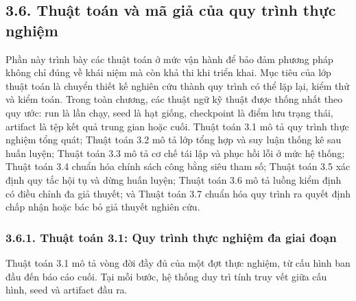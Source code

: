 \documentclass[a4paper,12pt]{article}
\begin{document}
\subsection{3.6. Thuật toán và mã giả của quy trình thực nghiệm}

Phần này trình bày các thuật toán ở mức vận hành để bảo đảm phương pháp không chỉ đúng về khái niệm mà còn khả thi khi triển khai. Mục tiêu của lớp thuật toán là chuyển thiết kế nghiên cứu thành quy trình có thể lặp lại, kiểm thử và kiểm toán. Trong toàn chương, các thuật ngữ kỹ thuật được thống nhất theo quy ước: run là lần chạy, seed là hạt giống, checkpoint là điểm lưu trạng thái, artifact là tệp kết quả trung gian hoặc cuối. Thuật toán 3.1 mô tả quy trình thực nghiệm tổng quát; Thuật toán 3.2 mô tả lớp tổng hợp và suy luận thống kê sau huấn luyện; Thuật toán 3.3 mô tả cơ chế tái lập và phục hồi lỗi ở mức hệ thống; Thuật toán 3.4 chuẩn hóa chính sách công bằng siêu tham số; Thuật toán 3.5 xác định quy tắc hội tụ và dừng huấn luyện; Thuật toán 3.6 mô tả luồng kiểm định có điều chỉnh đa giả thuyết; và Thuật toán 3.7 chuẩn hóa quy trình ra quyết định chấp nhận hoặc bác bỏ giả thuyết nghiên cứu.

\subsubsection{3.6.1. Thuật toán 3.1: Quy trình thực nghiệm đa giai đoạn}

Thuật toán 3.1 mô tả vòng đời đầy đủ của một đợt thực nghiệm, từ cấu hình ban đầu đến báo cáo cuối. Tại mỗi bước, hệ thống duy trì tính truy vết giữa cấu hình, seed và artifact đầu ra.
\end{document}

